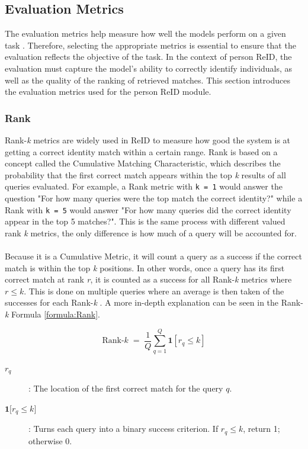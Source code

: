 \subsection{Evaluation Metrics}\label{reidmethodevalmetric}
The evaluation metrics help measure how well the models perform on a given task \cite{evaluationmetrics}. Therefore, selecting the appropriate metrics is essential to ensure that the evaluation reflects the objective of the task. In the context of person \acs{ReID}, the evaluation must capture the model's ability to correctly identify individuals, as well as the quality of the ranking of retrieved matches. This section introduces the evaluation metrics used for the person \acs{ReID} module.

\subsubsection*{Rank}
Rank-\textit{k} metrics are widely used in \acs{ReID} to measure how good the system is at getting a correct identity match within a certain range. Rank is based on a concept called the Cumulative Matching Characteristic, which describes the probability that the first correct match appears within the top \textit{k} results of all queries evaluated. For example, a Rank metric with \texttt{k = 1} would answer the question "For how many queries were the top match the correct identity?" while a Rank with \texttt{k = 5} would answer "For how many queries did the correct identity appear in the top 5 matches?". This is the same process with different valued rank \textit{k} metrics, the only difference is how much of a query will be accounted for.
\\\\
Because it is a Cumulative Metric, it will count a query as a success if the correct match is within the top \textit{k} positions. In other words, once a query has its first correct match at rank \textit{r}, it is counted as a success for all Rank-\textit{k} metrics where \(r \le k\). This is done on multiple queries where an average is then taken of the successes for each Rank-\textit{k} \cite{rankmetricEvidently}. A more in-depth explanation can be seen in the Rank-\textit{k} Formula \ref{formula:Rank}.

\begin{equation}
\mathrm{Rank}\text{-}k
\;=\;
\frac{1}{Q}\sum_{q=1}^{Q}\mathbf{1}\!\left[r_q \le k\right]
    \label{formula:Rank}
\end{equation}

\begin{description}
    \item[$r_q$]: The location of the first correct match for the query $q$.
    \item[$\mathbf{1}\lbrack r_q \le k\rbrack$]: Turns each query into a binary success criterion. If $r_q \le k$, return 1; otherwise 0.
\end{description}

